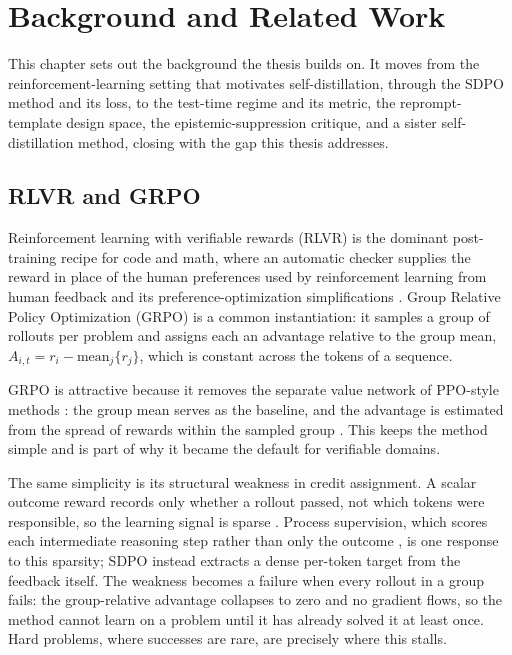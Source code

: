 \chapter{Background and Related Work}\label{chapter-2-background-and-related-work}

This chapter sets out the background the thesis builds on. It moves from the reinforcement-learning setting that motivates self-distillation, through the SDPO method and its loss, to the test-time regime and its metric, the reprompt-template design space, the epistemic-suppression critique, and a sister self-distillation method, closing with the gap this thesis addresses.

\section{RLVR and GRPO}\label{rlvr-and-grpo}

Reinforcement learning with verifiable rewards (RLVR) is the dominant post-training recipe for code and math, where an automatic checker supplies the reward in place of the human preferences used by reinforcement learning from human feedback \cite{r15} and its preference-optimization simplifications \cite{r16}. Group Relative Policy Optimization (GRPO) \cite{r8} is a common instantiation: it samples a group of rollouts per problem and assigns each an advantage relative to the group mean, \(A_{i,t} = r_i - \text{mean}_j\{r_j\}\), which is constant across the tokens of a sequence.

GRPO is attractive because it removes the separate value network of PPO-style methods \cite{r14}: the group mean serves as the baseline, and the advantage is estimated from the spread of rewards within the sampled group \cite{r8}. This keeps the method simple and is part of why it became the default for verifiable domains.

The same simplicity is its structural weakness in credit assignment. A scalar outcome reward records only whether a rollout passed, not which tokens were responsible, so the learning signal is sparse \cite{r1}. Process supervision, which scores each intermediate reasoning step rather than only the outcome \cite{r22}, is one response to this sparsity; SDPO instead extracts a dense per-token target from the feedback itself. The weakness becomes a failure when every rollout in a group fails: the group-relative advantage collapses to zero and no gradient flows, so the method cannot learn on a problem until it has already solved it at least once. Hard problems, where successes are rare, are precisely where this stalls.

